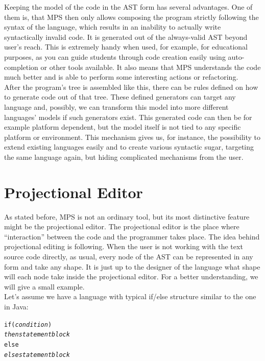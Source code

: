 Keeping the model of the code in the AST form has several advantages.
One of them is, that  MPS then only allows composing the program strictly following the syntax of the language, which results in an inability to actually write syntactically invalid code.
It is generated out of the always-valid AST beyond user's reach.
This is extremely handy when used, for example, for educational purposes, as you can guide students through code creation easily using auto-completion or other tools available.
It also means that MPS understands the code much better and is able to perform some interesting actions or refactoring.
\\

After the program's tree is assembled like this, there can be rules defined on how to generate code out of that tree.
These defined generators can target any language and, possibly, we can transform this model into more different languages' models if such generators exist.
This generated code can then be for example platform dependent, but the model itself is not tied to any specific platform or environment.
This mechanism gives us, for instance, the possibility to extend existing languages easily and to create various syntactic sugar, targeting the same language again, but hiding complicated mechanisms from the user.

\section{Projectional Editor}
As stated before, MPS is not an ordinary tool, but its most distinctive feature might be the projectional editor.
The projectional editor is the place where “interaction” between the code and the programmer takes place.
The idea behind projectional editing is following.
When the user is not working with the text source code directly, as usual, every node of the AST can be represented in any form and take any shape.
It is just up to the designer of the language what shape will each node take inside the projectional editor.
For a better understanding, we will give a small example.
\\

Let's assume we have a language with typical if/else structure similar to the one in Java:

\begin{center}
	\begin{minipage}{.38\textwidth}
		\begin{alltt}
			if (\textit{condition})
			    \textit{then statement block}
			else
			    \textit{else statement block}
		\end{alltt}
	\end{minipage}
\end{center}

